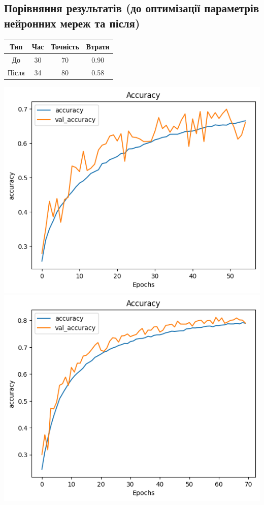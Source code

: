 \documentclass{article}
\begin{document}
        \subsection{Порівняння результатів (до оптимізації параметрів нейронних мереж та після)}
            \begin{tabular}{ |c|c|c|c| }
                \hline
                Тип & Час & Точність & Втрати\\ 
                \hline
                До & 30 & 70 & 0.90\\
                \hline
                Після & 34 & 80 & 0.58\\
                \hline
            \end{tabular}
    \newpage
            \includegraphics[scale=0.5]{before_acc.png}
            \includegraphics[scale=0.5]{after_acc.png}
\end{document}
